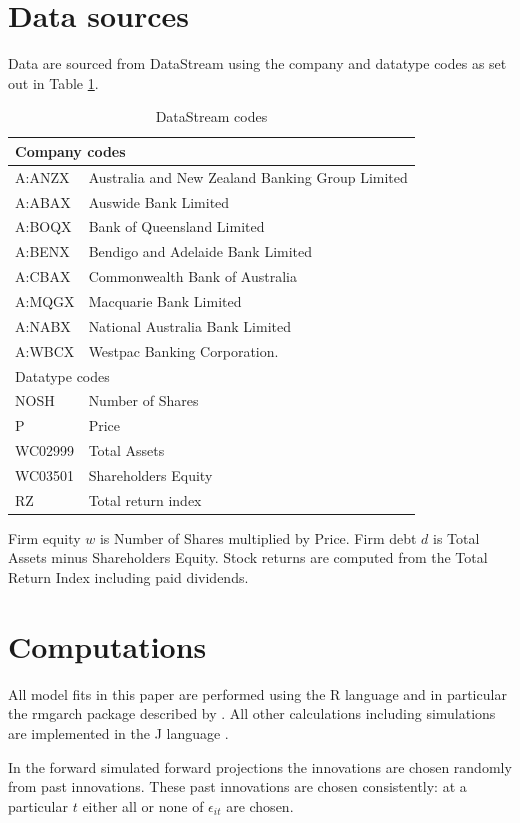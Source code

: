 \documentclass[authoryear]{elsarticle}
\newcommand{\eps}{\epsilon}
\newcommand{\tref}[1]{Table \ref{#1}}
\begin{document}
\section{Data sources}\label{data}

Data are sourced from DataStream using the company and datatype codes as set out in \tref{datastream}.

\begin{table}\caption{DataStream codes}\label{datastream}
\begin{center}
	\begin{tabular}{l|l}
	\hline
	\multicolumn{2}{l}{Company codes}\\
	\hline
A:ANZX & Australia and New Zealand Banking Group Limited\\
A:ABAX & Auswide Bank Limited\\
A:BOQX & Bank of Queensland Limited\\
A:BENX & Bendigo and Adelaide Bank Limited\\
A:CBAX & Commonwealth Bank of Australia\\
A:MQGX & Macquarie Bank Limited\\
A:NABX & National Australia Bank Limited\\
A:WBCX & Westpac Banking Corporation.\\
\hline
\multicolumn{2}{l}{Datatype codes}\\
\hline
	NOSH & Number of Shares\\
	P & Price\\
	WC02999 & Total Assets\\
	WC03501 & Shareholders Equity\\
	RZ & Total return index\\
\hline	
\end{tabular}
\end{center}
\end{table}

Firm equity $w$ is Number of Shares multiplied by Price. Firm debt $d$ is Total Assets minus Shareholders Equity. Stock returns are computed from the Total Return Index including paid dividends. 

\section{Computations}

All model fits in this paper are performed using the R language \citep{R-Development-Core-Team:2008aa} and in particular the rmgarch package described by \cite{ghalanos2012rmgarch}.  All other calculations including simulations are implemented in the J language \citep{iverson2003j}.

In the forward simulated forward projections the  innovations are chosen randomly from past innovations.   These past innovations are chosen consistently:  at a particular $t$ either all or none of $\eps_{it}$ are chosen.


\end{document}
